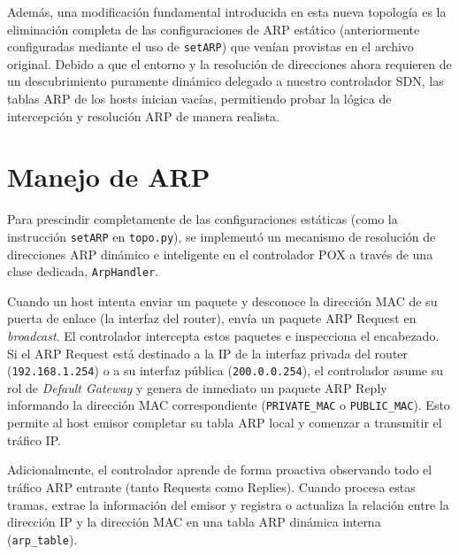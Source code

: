 \documentclass[11pt, a4paper]{article}
\begin{document}
Además, una modificación fundamental introducida en esta nueva topología es la eliminación completa de las configuraciones de ARP estático (anteriormente configuradas mediante el uso de \texttt{setARP}) que venían provistas en el archivo original. Debido a que el entorno y la resolución de direcciones ahora requieren de un descubrimiento puramente dinámico delegado a nuestro controlador SDN, las tablas ARP de los hosts inician vacías, permitiendo probar la lógica de intercepción y resolución ARP de manera realista.


\section{Manejo de ARP}
\label{sec:manejo_arp}

Para prescindir completamente de las configuraciones estáticas (como la instrucción \texttt{setARP} en \texttt{topo.py}), se implementó un mecanismo de resolución de direcciones ARP dinámico e inteligente en el controlador POX a través de una clase dedicada, \texttt{ArpHandler}.

Cuando un host intenta enviar un paquete y desconoce la dirección MAC de su puerta de enlace (la interfaz del router), envía un paquete ARP Request en \textit{broadcast}. El controlador intercepta estos paquetes e inspecciona el encabezado. Si el ARP Request está destinado a la IP de la interfaz privada del router (\texttt{192.168.1.254}) o a su interfaz pública (\texttt{200.0.0.254}), el controlador asume su rol de \textit{Default Gateway} y genera de inmediato un paquete ARP Reply informando la dirección MAC correspondiente (\texttt{PRIVATE\_MAC} o \texttt{PUBLIC\_MAC}). Esto permite al host emisor completar su tabla ARP local y comenzar a transmitir el tráfico IP.

Adicionalmente, el controlador aprende de forma proactiva observando todo el tráfico ARP entrante (tanto Requests como Replies). Cuando procesa estas tramas, extrae la información del emisor y registra o actualiza la relación entre la dirección IP y la dirección MAC en una tabla ARP dinámica interna (\texttt{arp\_table}).
\end{document}
